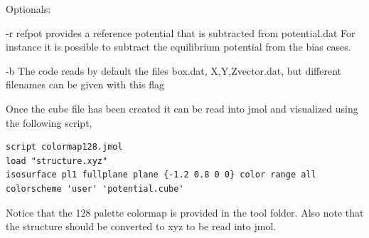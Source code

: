 Optionals:

 -r  refpot provides a reference potential that is subtracted from potential.dat
     For instance it is possible to subtract the equilibrium potential from the
     bias cases.
 
 -b  The code reads by default the files box.dat, X,Y,Zvector.dat, but 
     different filenames can be given with this flag

Once the cube file has been created it can be read into jmol and visualized
using the following script,
\begin{verbatim}
script colormap128.jmol
load "structure.xyz"
isosurface pl1 fullplane plane {-1.2 0.8 0 0} color range all colorscheme 'user' 'potential.cube'
\end{verbatim}

Notice that the 128 palette colormap is provided in the tool folder.
Also note that the structure should be converted to xyz to be read into jmol.


